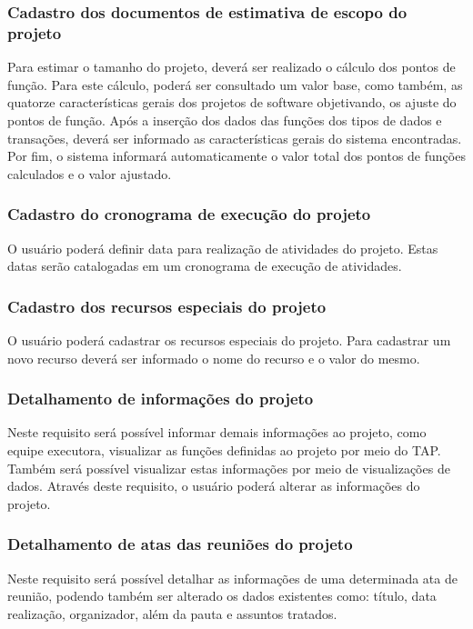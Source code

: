 \documentclass{acm_proc_article-sp}
\begin{document}
\subsubsection{Cadastro dos documentos de estimativa de escopo do projeto}
Para estimar o tamanho do projeto, deverá ser realizado o cálculo dos pontos de função. Para este cálculo, poderá ser consultado um valor base, como também, as quatorze características gerais dos projetos de software objetivando, os ajuste do pontos de função. Após a inserção dos dados das funções dos tipos de dados e transações, deverá ser informado as características gerais do sistema encontradas. Por fim, o sistema informará automaticamente o valor total dos pontos de funções calculados e o valor ajustado.

\subsubsection{Cadastro do cronograma de execução do projeto}
O usuário poderá definir data para realização de atividades do projeto. Estas datas serão catalogadas em um cronograma de execução de atividades.

\subsubsection{Cadastro dos recursos especiais do projeto}
O usuário poderá cadastrar os recursos especiais do projeto. Para cadastrar um novo recurso deverá ser informado o nome do recurso e o valor do mesmo.

\subsubsection{Detalhamento de informações do projeto}
Neste requisito será possível informar demais informações ao projeto, como equipe executora, visualizar as funções definidas ao projeto por meio do TAP. Também será possível visualizar estas informações por meio de visualizações de dados. Através deste requisito, o usuário poderá alterar as informações do projeto. 

\subsubsection{Detalhamento de atas das reuniões do projeto}
Neste requisito será possível detalhar as informações de uma determinada ata de reunião, podendo também ser alterado os dados existentes como: título, data realização, organizador, além da pauta e assuntos tratados.
\end{document}
